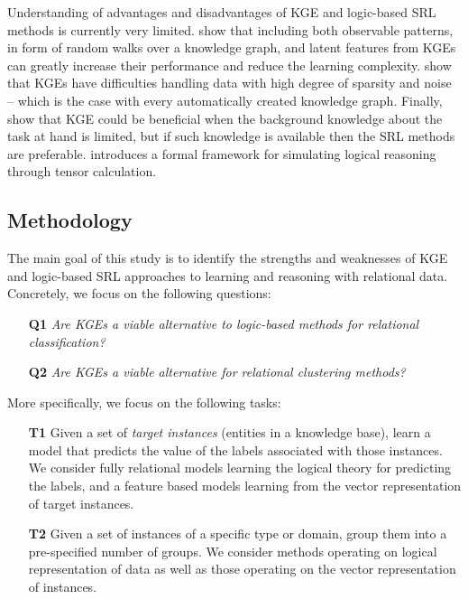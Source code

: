 Understanding of advantages and disadvantages of KGE and logic-based SRL methods is currently very limited.
\cite{NickleNIPS2014} show that including both observable patterns, in form of random walks over a knowledge graph, and latent features from KGEs can greatly increase their performance and reduce the learning complexity.
\cite{pujara:emnlp17} show that KGEs have difficulties handling data with high degree of sparsity and noise -- which is the case with every automatically created knowledge graph.  
Finally, \cite{VigILP2017} show that KGE could be beneficial when the background knowledge about the task at hand is limited, but if such knowledge is available then the SRL methods are preferable.
\cite{GrefenstetteTFDS}  introduces a formal framework for simulating logical reasoning through tensor calculation.












%
%
\subsection{Methodology}

The main goal of this study is to identify the strengths and weaknesses of  KGE and logic-based SRL approaches to learning and reasoning with relational data.
Concretely, we focus on the following questions:
\begin{itemize}
	\setlength{\itemindent}{1em}
	\item[\textbf{Q1}] \textit{Are KGEs a viable alternative to logic-based methods for relational classification?}
	\item[\textbf{Q2}] \textit{Are KGEs a viable alternative for relational clustering methods?} 
\end{itemize}

More specifically, we focus on the following tasks:
\begin{itemize}
    \setlength{\itemindent}{1em}
    \item[\textbf{T1}] Given a set of \textit{target instances} (entities in a knowledge base), learn a model that predicts the value of the labels associated with those instances. We consider fully relational models learning the logical theory for predicting the labels, and a feature based models learning from the vector representation of target instances.
    \item[\textbf{T2}] Given a set of instances of a specific type or domain, group them into a pre-specified number of groups. We consider methods operating on logical representation of data as well as those operating on the vector representation of instances.
\end{itemize}

